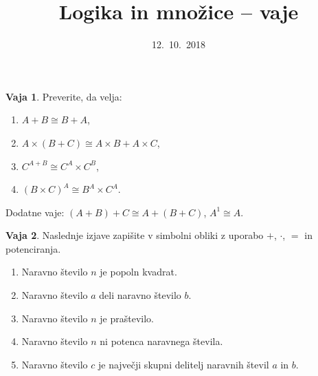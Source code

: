 \documentclass{article}
\theoremstyle{definition}
\newtheorem{vaja}{Vaja}
\begin{document}
\title{Logika in množice -- vaje}
\date{12.~10.~2018}
\maketitle


\begin{vaja}
  Preverite, da velja:
  \begin{enumerate}
  \item $A + B \cong B + A$,
  \item $A \times (B + C) \cong A \times B + A \times C$,
  \item $C^{A + B} \cong C^A \times C^B$,
  \item $(B \times C)^A \cong B^A \times C^A$.
  \end{enumerate}
  Dodatne vaje: $(A + B) + C \cong A + (B + C)$, $A^1 \cong A$.
\end{vaja}

\begin{vaja}
Naslednje izjave zapišite v simbolni obliki z uporabo $+$, $\cdot$, $=$ in potenciranja.
 \begin{enumerate}
 \item Naravno število $n$ je popoln kvadrat.  %
 \item Naravno število $a$ deli naravno število $b$. %
 \item Naravno število $n$ je praštevilo.%
  \item Naravno število $n$ ni potenca naravnega števila.%
  \item Naravno število $c$ je največji skupni delitelj naravnih števil $a$ in $b$. %
 
\end{enumerate}
\end{vaja}
\end{document}
